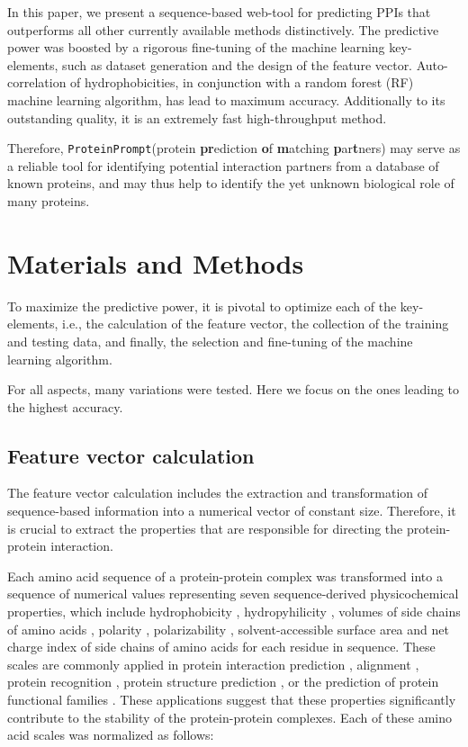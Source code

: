 \documentclass[preprint,3p,times,twocolumn]{elsarticle}
\newcommand{\toolblank}{\texttt{ProteinPrompt}}
\newcommand{\tool}{\toolblank\hspace{2pt}}
\begin{document}
In this paper, we present a sequence-based web-tool for predicting
PPIs that outperforms all other currently available methods distinctively.
The predictive power was boosted by a rigorous fine-tuning
of the machine learning key-elements, such as
dataset generation and the design of the feature vector.
Auto-correlation of hydrophobicities,
in conjunction with a random forest (RF) machine learning algorithm,
has lead to maximum accuracy.
Additionally to its outstanding quality, it is 
an extremely fast high-throughput
method.

Therefore, \tool (protein \textbf{pr}ediction \textbf{o}f \textbf{m}atching \textbf{p}ar\textbf{t}ners)
may serve as a reliable tool for identifying potential interaction partners from a database of
known proteins, and may thus help to identify the yet unknown
biological role of many proteins.



\section{Materials and Methods}

To maximize the predictive power, it is pivotal to optimize each of
the key-elements, i.e., the calculation of the feature vector, the
collection of the training and testing data, and finally, the
selection and fine-tuning of the machine learning algorithm. 

For all aspects, many variations were tested. Here we focus on the
ones leading to the highest accuracy. 


\subsection{Feature vector calculation}
The feature vector calculation includes the extraction and
transformation of sequence-based information into a numerical vector
of constant size. Therefore, it is crucial to extract the properties
that are responsible for directing the protein-protein interaction. 

Each amino acid sequence of a protein-protein complex was transformed
into a sequence of numerical values representing seven
sequence-derived physicochemical properties, which include
hydrophobicity \cite{Eisenberg:1984, Koehler:2009}, hydropyhilicity
\cite{Hopp:1981}, volumes of side chains of amino acids
\cite{Krigbaum:1979}, polarity \cite{Grantham:1974}, polarizability
\cite{Charton:1982}, solvent-accessible surface area \cite{Rose:1985}
and net charge index of side chains of amino acids \cite{Zhou:2006}
for each residue in sequence. These scales are commonly applied in
protein interaction prediction \cite{Bock:2001} \cite{Bock:2003},
alignment \cite{Stamm:2013}, protein recognition \cite{Ding:2001},
protein structure prediction \cite{Durham:2009}, or the prediction of
protein functional families \cite{Cai:2003}. These applications
suggest that these properties significantly contribute to the
stability of the protein-protein complexes. Each of these amino acid
scales was normalized as follows: 
\end{document}
